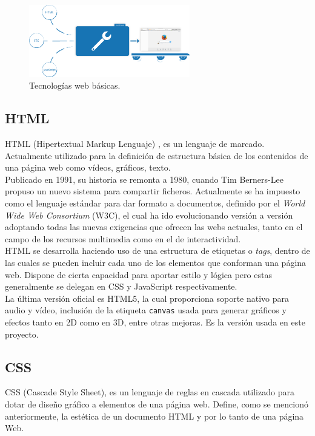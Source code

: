 \documentclass[a4paper, 12pt]{book}
\begin{document}
		\begin{figure}[H]
			\centering
			\includegraphics[width=7cm, keepaspectratio]{img/html_css_js.png}
			\caption{Tecnologías web básicas.}
			\label{fig:HTML_CSS_JS}
		\end{figure}
	
	\subsection{HTML}
	\label{subsec:html}
		HTML (Hipertextual Markup Lenguaje) \cite{HTML}, es un lenguaje de marcado. Actualmente utilizado para la definición de  estructura básica de los contenidos de una página web como vídeos, gráficos, texto. \\
		
		Publicado en 1991, su historia se remonta a 1980, cuando Tim Berners-Lee propuso un nuevo sistema para compartir ficheros. Actualmente se ha impuesto como el lenguaje estándar para dar formato a documentos, definido por el \textit{World Wide Web Consortium} (W3C), el cual ha ido evolucionando versión a versión adoptando todas las nuevas exigencias que ofrecen las webs actuales, tanto en el campo de los recursos multimedia como en el de interactividad.\\
		
		HTML se desarrolla haciendo uso de una estructura de etiquetas o \textit{tags}, dentro de las cuales se pueden incluir cada uno de los elementos que conforman una página web. Dispone de cierta capacidad para aportar estilo y lógica pero estas generalmente se delegan en CSS y JavaScript respectivamente.\\
		
		La última versión oficial es HTML5, la cual proporciona soporte nativo para audio y vídeo, inclusión de la etiqueta \texttt{canvas} usada para generar gráficos y efectos tanto en 2D como en 3D, entre otras mejoras. Es la versión usada en este proyecto.
		
	\subsection{CSS}
	\label{subsec:css}
		CSS (Cascade Style Sheet), es un lenguaje de reglas en cascada utilizado para dotar de diseño gráfico a elementos de una página web. Define, como se mencionó anteriormente, la estética de un documento HTML y por lo tanto de una página Web. \\
		
\end{document}
